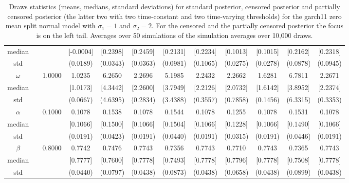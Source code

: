 {\begin{sidewaystable}
\begin{tabular}{cc cc| cccc| cccc}
median &&  & [-0.0004] & [0.2398] & [0.2459] & [0.2131] & [0.2234] & [0.1013] & [0.1015] & [0.2162] & [0.2318]  \\ 
std &&   & (0.0189) & (0.0343) & (0.0363) & (0.0981) & (0.1065) &(0.0275) & (0.0278) & (0.0878) & (0.0945)  \\ 
 \rowcolor{LightCyan} 
$\omega$&& 1.0000 & 1.0235 & 6.2650 & 2.2696 & 5.1985 & 2.2432 & 2.2662 & 1.6281 & 6.7811 & 2.2671  \\   
median &&  & [1.0173] & [4.3442] & [2.2600] & [3.7949] & [2.2126] & [2.0732] & [1.6142] & [3.8952] & [2.2374]  \\ 
std &&   & (0.0667) & (4.6395) & (0.2834) & (3.4388) & (0.3557) &(0.7858) & (0.1456) & (6.3315) & (0.3353)  \\ 
 \rowcolor{LightCyan} 
$\alpha$&& 0.1000 & 0.1078 & 0.1538 & 0.1078 & 0.1544 & 0.1078 & 0.1255 & 0.1078 & 0.1531 & 0.1078  \\   
median &&  & [0.1066] & [0.1500] & [0.1066] & [0.1504] & [0.1066] & [0.1228] & [0.1066] & [0.1490] & [0.1066]  \\ 
std &&   & (0.0191) & (0.0423) & (0.0191) & (0.0440) & (0.0191) &(0.0315) & (0.0191) & (0.0446) & (0.0191)  \\ 
 \rowcolor{LightCyan} 
$\beta$&& 0.8000 & 0.7742 & 0.7476 & 0.7743 & 0.7356 & 0.7743 & 0.7710 & 0.7743 & 0.7365 & 0.7743  \\   
median &&  & [0.7777] & [0.7600] & [0.7778] & [0.7493] & [0.7778] & [0.7796] & [0.7778] & [0.7508] & [0.7778]  \\ 
std &&   & (0.0440) & (0.0797) & (0.0438) & (0.0873) & (0.0438) &(0.0658) & (0.0438) & (0.0899) & (0.0438)  \\ 
\hline 
\end{tabular}
 \caption{Draws statistics (means, medians, standard deviations) for standard posterior, censored posterior and partially censored posterior (the latter two with two time-constant and two time-varying thresholds) for the garch11 zero mean split normal model with $\sigma_{1} = 1$ and $\sigma_{2} = 2$. For the censored and the partially censored posterior the focus is on the left tail. Averages over 50 simulations of the simulation averages over 10,000 draws.} 
\label{tab:garch11_pcp_draws}  
\end{sidewaystable}
}
